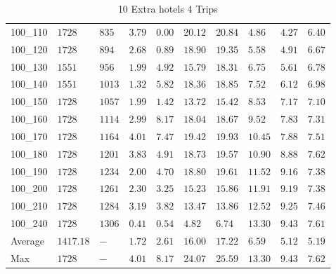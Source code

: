 \begin{center}
\begin{table}[]
\begin{adjustwidth}{-0.4in}{-1in}
\begin{tabular}{|lll|l|l|ll|lll|}
100\_110& $1728   $& $835 $ & $3.79$ & $\bm{0.00}$   & $20.12$    & $20.84$   & $4.86 $& $4.27$   & $6.40$ \\
100\_120& $1728   $& $894 $ & $2.68$ & $0.89$   & $18.90$    & $19.35$   & $5.58 $& $4.91$   & $6.67$ \\
100\_130& $1551   $& $956 $ & $1.99$ & $4.92$   & $15.79$    & $18.31$   & $6.75 $& $5.61$   & $6.78$ \\
100\_140& $1551   $& $1013$ & $1.32$ & $5.82$   & $18.36$    & $18.85$   & $7.52 $& $6.12$   & $6.98$ \\
100\_150& $1728   $& $1057$ & $1.99$ & $1.42$   & $13.72$    & $15.42$   & $8.53 $& $7.17$   & $7.10$ \\
100\_160& $1728   $& $1114$ & $2.99$ & $8.17$   & $18.04$    & $18.67$   & $9.52 $& $7.83$   & $7.31$ \\
100\_170& $1728   $& $1164$ & $4.01$ & $7.47$   & $19.42$    & $19.93$   & $10.45$& $7.88$   & $7.51$ \\
100\_180& $1728   $& $1201$ & $3.83$ & $4.91$   & $18.73$    & $19.57$   & $10.90$& $8.88$   & $7.62$ \\
100\_190& $1728   $& $1234$ & $2.00$ & $4.70$   & $18.80$    & $19.61$   & $11.52$& $9.16$   & $7.38$ \\
100\_200& $1728   $& $1261$ & $2.30$ & $3.25$   & $15.23$    & $15.86$   & $11.91$& $9.19$   & $7.38$ \\
100\_210& $1728   $& $1284$ & $3.19$ & $3.82$   & $13.47$    & $13.86$   & $12.52$& $9.25$   & $7.46$ \\
100\_240& $1728   $& $1306$ & $0.41$ & $0.54$   & $4.82$    & $6.74$   & $13.30$& $9.43$   & $7.61$ \\
\hline
Average & $1417.18$& $-   $ & $1.72$ & $2.61$   & $16.00$    & $17.22$   & $6.59 $& $5.12$   & $5.19$ \\
Max     & $1728   $& $-   $ & $4.01$ & $8.17$   & $24.07$    & $25.59$   & $13.30$& $9.43$   & $7.62$ \\
\hline
\end{tabular}
    \end{adjustwidth}
    \caption{10 Extra hotels 4 Trips}
    \label{10-4}
    \end{table}
\end{center}
